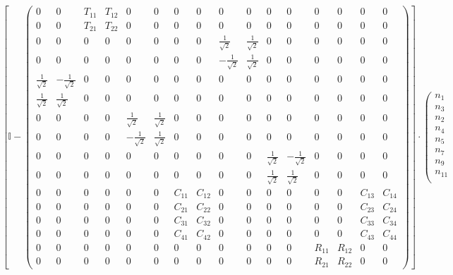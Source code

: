 \[ \left[ \mathbb{I}  - \left(\begin{smallmatrix} 0 & 0 & T_{11} &
T_{12} & 0 & 0 & 0 & 0 & 0 & 0 & 0 & 0 & 0 & 0 & 0 & 0 \\ 0 & 0 &
T_{21} & T_{22} & 0 & 0 & 0 & 0 & 0 & 0 & 0 & 0 & 0 & 0 & 0 & 0 \\ 0 &
0 & 0 & 0 & 0 & 0 & 0 & 0 & \frac{1}{\sqrt{2}} & \frac{1}{\sqrt{2}} &
0 & 0 & 0 & 0 & 0 & 0 \\ 0 & 0 & 0 & 0 & 0 & 0 & 0 & 0 &
-\frac{1}{\sqrt{2}} & \frac{1}{\sqrt{2}} & 0 & 0 & 0 & 0 & 0 & 0 \\
\frac{1}{\sqrt{2}} & -\frac{1}{\sqrt{2}} & 0 & 0 & 0 & 0 & 0 & 0 & 0 &
0 & 0 & 0 & 0 & 0 & 0 & 0 \\ \frac{1}{\sqrt{2}} & \frac{1}{\sqrt{2}} &
0 & 0 & 0 & 0 & 0 & 0 & 0 & 0 & 0 & 0 & 0 & 0 & 0 & 0 \\ 0 & 0 & 0 & 0
& \frac{1}{\sqrt{2}} & \frac{1}{\sqrt{2}} & 0 & 0 & 0 & 0 & 0 & 0 & 0
& 0 & 0 & 0 \\ 0 & 0 & 0 & 0 & -\frac{1}{\sqrt{2}} &
\frac{1}{\sqrt{2}} & 0 & 0 & 0 & 0 & 0 & 0 & 0 & 0 & 0 & 0 \\ 0 & 0 &
0 & 0 & 0 & 0 & 0 & 0 & 0 & 0 & \frac{1}{\sqrt{2}} &
-\frac{1}{\sqrt{2}} & 0 & 0 & 0 & 0 \\ 0 & 0 & 0 & 0 & 0 & 0 & 0 & 0 &
0 & 0 & \frac{1}{\sqrt{2}} & \frac{1}{\sqrt{2}} & 0 & 0 & 0 & 0 \\ 0 &
0 & 0 & 0 & 0 & 0 & C_{11} & C_{12} & 0 & 0 & 0 & 0 & 0 & 0 & C_{13} &
C_{14} \\ 0 & 0 & 0 & 0 & 0 & 0 & C_{21} & C_{22} & 0 & 0 & 0 & 0 & 0
& 0 & C_{23} & C_{24} \\ 0 & 0 & 0 & 0 & 0 & 0 & C_{31} & C_{32} & 0 &
0 & 0 & 0 & 0 & 0 & C_{33} & C_{34} \\ 0 & 0 & 0 & 0 & 0 & 0 & C_{41}
& C_{42} & 0 & 0 & 0 & 0 & 0 & 0 & C_{43} & C_{44} \\ 0 & 0 & 0 & 0 &
0 & 0 & 0 & 0 & 0 & 0 & 0 & 0 & R_{11} & R_{12} & 0 & 0 \\ 0 & 0 & 0 &
0 & 0 & 0 & 0 & 0 & 0 & 0 & 0 & 0 & R_{21} & R_{22} & 0 & 0
\end{smallmatrix}\right)\right] \cdot \left(\begin{smallmatrix} n_{1}
\\ n_{3} \\ n_{2} \\ n_{4} \\ n_{5} \\ n_{7} \\ n_{9} \\ n_{11} \\

\end{smallmatrix}\]
